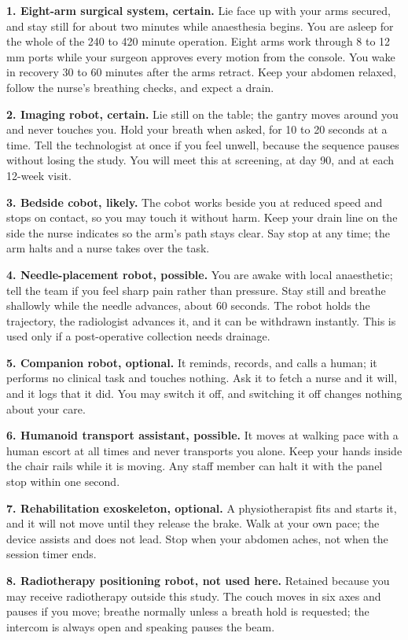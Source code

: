 \textbf{1. Eight-arm surgical system, certain.} Lie face up with your arms
secured, and stay still for about two minutes while anaesthesia begins. You are
asleep for the whole of the 240 to 420 minute operation. Eight arms work through
8 to 12 mm ports while your surgeon approves every motion from the console. You
wake in recovery 30 to 60 minutes after the arms retract. Keep your abdomen
relaxed, follow the nurse's breathing checks, and expect a drain.

\textbf{2. Imaging robot, certain.} Lie still on the table; the gantry moves
around you and never touches you. Hold your breath when asked, for 10 to 20
seconds at a time. Tell the technologist at once if you feel unwell, because the
sequence pauses without losing the study. You will meet this at screening, at
day 90, and at each 12-week visit.

\textbf{3. Bedside cobot, likely.} The cobot works beside you at reduced speed
and stops on contact, so you may touch it without harm. Keep your drain line on
the side the nurse indicates so the arm's path stays clear. Say stop at any
time; the arm halts and a nurse takes over the task.

\textbf{4. Needle-placement robot, possible.} You are awake with local
anaesthetic; tell the team if you feel sharp pain rather than pressure. Stay
still and breathe shallowly while the needle advances, about 60 seconds. The
robot holds the trajectory, the radiologist advances it, and it can be withdrawn
instantly. This is used only if a post-operative collection needs drainage.

\textbf{5. Companion robot, optional.} It reminds, records, and calls a human;
it performs no clinical task and touches nothing. Ask it to fetch a nurse and it
will, and it logs that it did. You may switch it off, and switching it off
changes nothing about your care.

\textbf{6. Humanoid transport assistant, possible.} It moves at walking pace
with a human escort at all times and never transports you alone. Keep your hands
inside the chair rails while it is moving. Any staff member can halt it with the
panel stop within one second.

\textbf{7. Rehabilitation exoskeleton, optional.} A physiotherapist fits and
starts it, and it will not move until they release the brake. Walk at your own
pace; the device assists and does not lead. Stop when your abdomen aches, not
when the session timer ends.

\textbf{8. Radiotherapy positioning robot, not used here.} Retained because you
may receive radiotherapy outside this study. The couch moves in six axes and
pauses if you move; breathe normally unless a breath hold is requested; the
intercom is always open and speaking pauses the beam.

